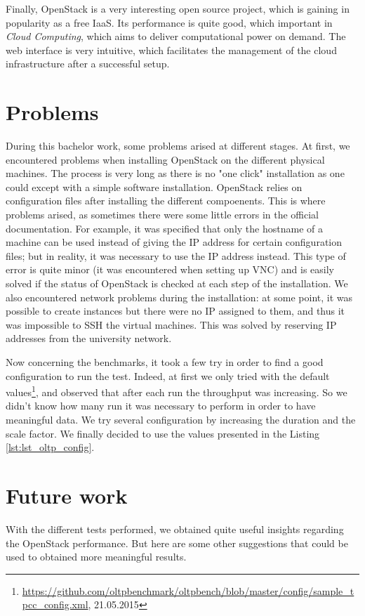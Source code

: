 Finally, OpenStack is a very interesting open source project, which is gaining in popularity as a free IaaS.
Its performance is quite good, which important in \textit{Cloud Computing}, which aims to deliver computational power on demand.
The web interface is very intuitive, which facilitates the management of the cloud infrastructure after a successful setup.







\section{Problems}
During this bachelor work, some problems arised at different stages. 
At first, we encountered problems when installing OpenStack on the different physical machines.
The process is very long as there is no "one click" installation as one could except with a simple software installation.
OpenStack relies on configuration files after installing the different compoenents.
This is where problems arised, as sometimes there were some little errors in the official documentation.
For example, it was specified that only the hostname of a machine can be used instead of giving the IP address for certain configuration files; but in reality, it was necessary to use the IP address instead. 
This type of error is quite minor (it was encountered when setting up VNC) and is easily solved if the status of OpenStack is checked at each step of the installation.
We also encountered network problems during the installation: at some point, it was possible to create instances but there were no IP assigned to them, and thus it was impossible to SSH the virtual machines.
This was solved by reserving IP addresses from the university network.

Now concerning the benchmarks, it took a few try in order to find a good configuration to run the test.
Indeed, at first we only tried with the default values\footnote{\url{https://github.com/oltpbenchmark/oltpbench/blob/master/config/sample_tpcc_config.xml}, 21.05.2015}, and observed that after each run the throughput was increasing.
So we didn't know how many run it was necessary to perform in order to have meaningful data.
We try several configuration by increasing the duration and the scale factor.
We finally decided to use the values presented in the Listing \ref{lst:lst_oltp_config}.


\section{Future work}
With the different tests performed, we obtained quite useful insights regarding the OpenStack performance.
But here are some other suggestions that could be used to obtained more meaningful results.

